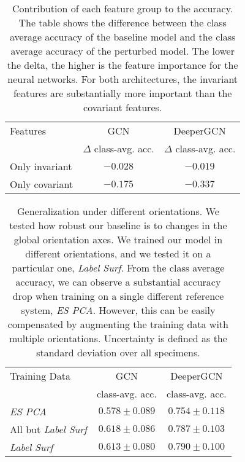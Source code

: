 \documentclass[10pt,twocolumn,letterpaper]{article}
\begin{document}
\begin{table}
  \centering
  \begin{tabular}{@{}lcc@{}}
    \toprule
    Features & GCN                      & DeeperGCN \\
             & $\Delta$ class-avg. acc. & $\Delta$ class-avg. acc. \\
    \midrule
    Only invariant     & $ -0.028 $ & $ -0.019 $  \\
    Only covariant     & $ -0.175 $ & $ -0.337 $  \\
    \bottomrule
  \end{tabular}
  \caption{Contribution of each feature group to the accuracy. The table shows the difference between the class average accuracy of the baseline model and the class average accuracy of the perturbed model. The lower the delta, the higher is the feature importance for the neural networks. For both architectures, the invariant features are substantially more important than the covariant features.}
  \label{tab:features_importance}
\end{table}

\begin{table}
  \centering
  \begin{tabular}{@{}lcc@{}}
    \toprule
    Training Data & GCN & DeeperGCN \\
                  & class-avg. acc.      & class-avg. acc.  \\
    \midrule
    \textit{ES PCA}             & $ 0.578 \pm  0.089$ & $ 0.754 \pm  0.118$ \\
    All but \textit{Label Surf} & $ 0.618 \pm  0.086$ & $ 0.787 \pm  0.103$ \\
    \textit{Label Surf}         & $ 0.613 \pm  0.080$ & $ 0.790 \pm  0.100$ \\
    \bottomrule
  \end{tabular}
  \caption{Generalization under different orientations. We tested how robust our baseline is to changes in the global orientation axes. We trained our model in different orientations, and we tested it on a particular one, \textit{Label Surf}. From the class average accuracy, we can observe a substantial accuracy drop when training on a single different reference system, \textit{ES PCA}. However, this can be easily compensated by augmenting the training data with multiple orientations. Uncertainty is defined as the standard deviation over all specimens.}
  \label{tab:generalization}
\end{table}
\end{document}
